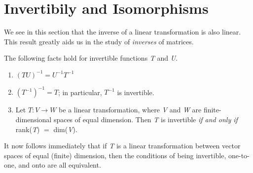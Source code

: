 \section{Invertibily and Isomorphisms}
We see in this section that the inverse of a linear transformation is also linear. This result greatly aids us  in the study of \textit{inverses} of matrices.


The following facts hold for invertible functions \textit{T} and \textit{U}.
\begin{enumerate}
  \item $(TU)^{-1} = U^{-1} T^{-1}$
  \item $(T^{-1})^{-1} = T$; in particular, $T^{-1}$ is invertible.
  \item Let $T : V \longrightarrow W$ be a linear transformation, where \textit{V} and \textit{W} are finite-dimensional spaces of equal dimension. Then \textit{T} is invertible \textit{if and only if} rank(\textit{T}) $=$ dim(\textit{V}).
\end{enumerate}


It now follows immediately that if \textit{T} is a linear transformation between vector spaces of equal (finite) dimension, then the conditions of being invertible, one-to-one, and onto are all equivalent.



